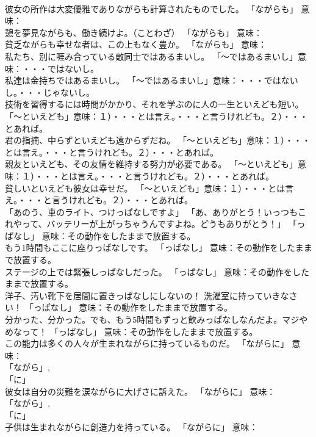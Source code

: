\documentclass[8pt]{extreport}
\begin{document}
\begin{CJK}{UTF8}{min}
\\	彼女の所作は大変優雅でありながらも計算されたものでした。	「ながらも」 意味：
\\	憩を夢見ながらも、働き続けよ。（ことわざ）	「ながらも」 意味：
\\	貧乏ながらも幸せな者は、この上もなく豊か。	「ながらも」 意味：
\\	私たち、別に啀み合っている敵同士ではあるまいし。	「～ではあるまいし」意味：・・・ではないし。	
\\	私達は金持ちではあるまいし。	「～ではあるまいし」意味：・・・ではないし。・・・じゃないし。	
\\	技術を習得するには時間がかかり、それを学ぶのに人の一生といえども短い。	「～といえども」意味：１）・・・とは言え。・・・と言うけれども。２）・・・とあれば。	
\\	君の指摘、中らずといえども遠からずだね。	「～といえども」意味：１）・・・とは言え。・・・と言うけれども。２）・・・とあれば。	
\\	親友といえども、その友情を維持する努力が必要である。	「～といえども」意味：１）・・・とは言え。・・・と言うけれども。２）・・・とあれば。	
\\	貧しいといえども彼女は幸せだ。	「～といえども」意味：１）・・・とは言え。・・・と言うけれども。２）・・・とあれば。	
\\	「あのう、車のライト、つけっぱなしですよ」 「あ、ありがとう！いっつもこれやって、バッテリーが上がっちゃうんですよね。どうもありがとう！」	「っぱなし」 意味：その動作をしたままで放置する。	
\\	もう1時間もここに座りっぱなしです。	「っぱなし」 意味：その動作をしたままで放置する。	
\\	ステージの上では緊張しっぱなしだった。	「っぱなし」 意味：その動作をしたままで放置する。	
\\	洋子、汚い靴下を居間に置きっぱなしにしないの！ 洗濯室に持っていきなさい！	「っぱなし」 意味：その動作をしたままで放置する。	
\\	分かった、分かった。でも、もう5時間もずっと飲みっぱなしなんだよ。マジやめなって！	「っぱなし」 意味：その動作をしたままで放置する。	
\\	この能力は多くの人々が生まれながらに持っているものだ。	「ながらに」 意味： 
\\	「ながら」, 
\\	「に」
\\	彼女は自分の災難を涙ながらに大げさに訴えた。	「ながらに」 意味： 
\\	「ながら」, 
\\	「に」
\\	子供は生まれながらに創造力を持っている。	「ながらに」 意味： 

\end{CJK}
\end{document}
